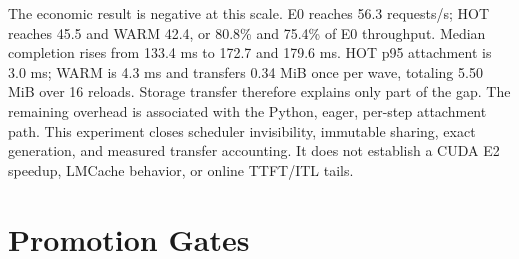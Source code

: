 \documentclass[10pt]{article}
\begin{document}
The economic result is negative at this scale. E0 reaches 56.3 requests/s;
HOT reaches 45.5 and WARM 42.4, or 80.8\% and 75.4\% of E0 throughput. Median
completion rises from 133.4 ms to 172.7 and 179.6 ms. HOT p95 attachment is
3.0 ms; WARM is 4.3 ms and transfers 0.34 MiB once per wave, totaling 5.50 MiB
over 16 reloads. Storage transfer therefore explains only part of the gap. The
remaining overhead is associated with the Python, eager, per-step attachment
path. This experiment closes scheduler invisibility, immutable sharing, exact
generation, and measured transfer accounting. It does not establish a CUDA E2
speedup, LMCache behavior, or online TTFT/ITL tails.

\clearpage
\section{Promotion Gates}
\end{document}
